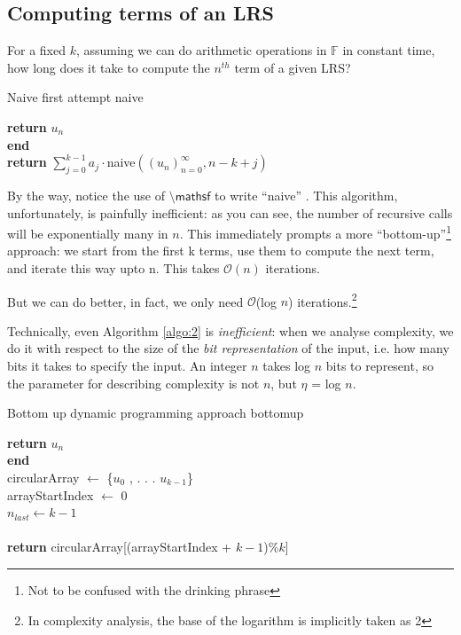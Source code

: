 \documentclass[a4paper,11pt]{article}
\numberwithin{definition}{section}
\numberwithin{mytheorem}{subsection}
\begin{document}
\subsection{Computing terms of an LRS}
For a fixed $k$, assuming we can do arithmetic operations in $\mathbb{F}$ in constant time, how long does it
take to compute the $n^{th}$ term of a given LRS?

\begin{algorithm}[ht]
\caption{Naive first attempt \textsf{naive}}
\label{algo:1}
\SetAlgoLined
\DontPrintSemicolon
{}
{\textbf{return} $u_n$}\\
\textbf{end}\\
\textbf{return} $\sum_{j=0}^{k-1} a_{j}\cdot$\textsf{naive}$((u_n)^\infty_{n=0}, n - k + j)$ 
\end{algorithm}

By the way, notice the use of $\textsf{\textbackslash mathsf}$ to write \textsf {“naive”} . This algorithm, unfortunately, is painfully inefficient: as you can see, the number of recursive calls will be exponentially many in $n$. This
immediately prompts a more “bottom-up”\footnote{Not to be confused with the drinking phrase} approach: we start from the first k terms, use them
to compute the next term, and iterate this way upto n. This takes $\mathcal{O}(n)$ iterations.

But we can do better, in fact, we only need $\mathcal{O}$(log $n$) iterations.\footnote{In complexity analysis, the base of the logarithm is implicitly taken as 2}

Technically, even Algorithm \ref{algo:2} is \emph{inefficient}: when we analyse complexity, we do it with respect to
the size of the \emph{bit representation} of the input, i.e. how many bits it takes to specify the input. An
integer $n$ takes log $n$ bits to represent, so the parameter for describing complexity is not $n$, but
$\eta$ = log $n$.

\begin{algorithm}[ht]
\caption{Bottom up dynamic programming approach  \textsf{bottomup}}
\label{algo:2}
\SetAlgoLined
\DontPrintSemicolon
{}
{\textbf{return} $u_n$}\\
\textbf{end}\\
\textsf{circularArray} $\longleftarrow$ \{$u_0$ , . . . $u_{k−1}$\}\\
\textsf{arrayStartIndex} $\longleftarrow$ 0\\
$n_{last}\longleftarrow k - 1$\\
\\
\textbf{return} \textsf{circularArray[(arrayStartIndex} + $k - 1$\textsf{)}\%$k$\textsf{]}
\end{algorithm}
\end{document}
